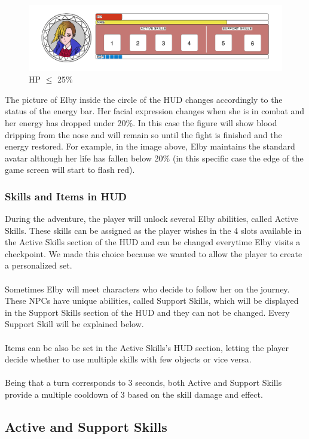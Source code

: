 \begin{figure}[H]
	\centering
	\includegraphics[width=14cm]{images/hud/HUD_life_red.png}
	\caption*{HP $\leq$ 25\%}
\end{figure}

The picture of Elby inside the circle of the HUD changes accordingly to the status of the energy bar. Her facial expression changes when she is in combat and her energy has dropped under 20\%. In this case the figure will show blood dripping from the nose and will remain so until the fight is finished and the energy restored. For example, in the image above, Elby maintains the standard avatar although her life has fallen below 20\% (in this specific case the edge of the game screen will start to flash red).

\subsubsection{Skills and Items in HUD}
During the adventure, the player will unlock several Elby abilities, called Active Skills. These skills can be assigned as the player wishes in the 4 slots available in the Active Skills section of the HUD and can be changed everytime Elby visits a checkpoint. We made this choice because we wanted to allow the player to create a personalized set.\\\\
Sometimes Elby will meet characters who decide to follow her on the journey. These NPCs have unique abilities, called Support Skills, which will be displayed in the Support Skills section of the HUD and they can not be changed. Every Support Skill will be explained below.\\\\
Items can be also be set in the Active Skills's HUD section, letting the player decide whether to use multiple skills with few objects or vice versa.\\\\
Being that a turn corresponds to 3 seconds, both Active and Support Skills provide a multiple cooldown of 3 based on the skill damage and effect.

\subsection{Active and Support Skills}

